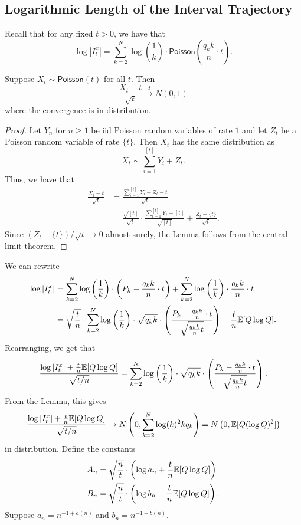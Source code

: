 \documentclass[12pt]{article}
\begin{document}
\subsection{Logarithmic Length of the Interval Trajectory}
Recall that for any fixed $t > 0$, we have that 
\[
	\log |I_t^x| = \sum_{k = 2}^N \log \left ( \frac{1}{k} \right ) \cdot \mathsf{Poisson} \left (\frac{q_k k}{n} \cdot t \right ).
\]

\begin{lem}
	Suppose $X_t \sim \mathsf{Poisson}(t)$ for all $t$. Then 
	\[
		\frac{X_t - t}{\sqrt{t}} \xrightarrow{d} N(0, 1)	
	\]
	where the convergence is in distribution.
\end{lem}
\begin{proof}
	Let $Y_n$ for $n \geq 1$ be iid Poisson random variables of rate $1$ and let $Z_t$ be a Poisson random variable of rate $\{t\}$. Then $X_t$ has the same distribution as 
	\[
		X_t \sim \sum_{i = 1}^{[t]} Y_i + Z_t.	
	\]
	Thus, we have that 
	\begin{align*}
		\frac{X_t - t}{\sqrt{t}} & = \frac{\sum_{i = 1}^{[t]} Y_i + Z_t-t}{\sqrt{t}} \\
		& = \frac{\sqrt{[t]}}{\sqrt{t}} \cdot \frac{\sum_{i = 1}^{[t]} Y_i - [t]}{\sqrt{[t]}} + \frac{Z_t - \{t\}}{\sqrt{t}}.
	\end{align*}
	Since $(Z_t - \{t\})/\sqrt{t} \to 0$ almost surely, the Lemma follows from the central limit theorem. 
\end{proof}
We can rewrite 
\begin{align*}
	\log |I_t^x| & = \sum_{k = 2}^N \log \left ( \frac{1}{k} \right ) \cdot \left ( P_k - \frac{q_k k}{n} \cdot t \right ) + \sum_{k = 2}^N \log \left ( \frac{1}{k} \right ) \cdot \frac{q_k k}{n} \cdot t	\\
	& = \sqrt{\frac{t}{n}} \cdot \sum_{k = 2}^N \log \left ( \frac{1}{k} \right ) \cdot \sqrt{q_k k} \cdot \left ( \frac{P_k - \frac{q_k k}{n} \cdot t}{\sqrt{\frac{q_k k}{n} t}} \right ) - \frac{t}{n} \mathbb{E}[Q \log Q].
\end{align*}
Rearranging, we get that 
\[
	\frac{\log |I_t^x| + \frac{t}{n} \mathbb{E}[Q \log Q]}{\sqrt{t/n}} = \sum_{k = 2}^N \log \left ( \frac{1}{k} \right ) \cdot \sqrt{q_k k} \cdot	\left ( \frac{P_k - \frac{q_k k}{n} \cdot t}{\sqrt{\frac{q_k k}{n} t}} \right ).
\]
From the Lemma, this gives 
\[
	\frac{\log |I_t^x| + \frac{t}{n} \mathbb{E}[Q \log Q]}{\sqrt{t/n}} \to N \left (0, \sum_{k = 2}^N \log(k)^2 k q_k \right ) = N \left (0, \mathbb{E}[Q (\log Q)^2] \right )
\]
in distribution. Define the constants
\begin{align*}
	A_n & = \sqrt{\frac{n}{t}} \cdot \left ( \log a_n + \frac{t}{n} \mathbb{E}[Q \log Q] \right ) \\
	B_n & = \sqrt{\frac{n}{t}} \cdot \left ( \log b_n + \frac{t}{n} \mathbb{E}[Q \log Q] \right ).
\end{align*}
Suppose $a_n = n^{-1 + a(n)}$ and $b_n = n^{-1 + b(n)}$. 
\end{document}
